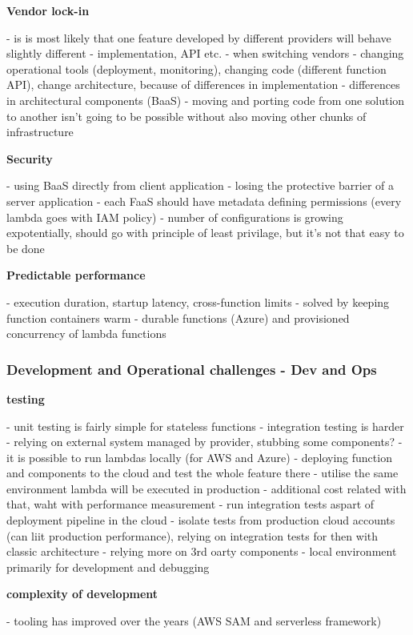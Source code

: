 \textbf{Vendor lock-in} 

- is is most likely that one feature developed by different providers will behave slightly different - implementation, API etc.
- when switching vendors - changing operational tools (deployment, monitoring), changing code (different function API), change architecture, because of differences in implementation
- differences in architectural components (BaaS) - moving and porting code from one solution to another isn't going to be possible without also moving other chunks of infrastructure

\textbf{Security} 

- using BaaS directly from client application - losing the protective barrier of a server application
- each FaaS should have metadata defining permissions (every lambda goes with IAM policy) - number of configurations is growing expotentially, should go with principle of least privilage, but it's not that easy to be done

\textbf{Predictable performance} 

- execution duration, startup latency, cross-function limits - solved by keeping function containers warm - durable functions (Azure) and provisioned concurrency of lambda functions

\subsubsection*{Development and Operational challenges - Dev and Ops} 

\textbf{testing} 

- unit testing is fairly simple for stateless functions
- integration testing is harder - relying on external system managed by provider, stubbing some components?
- it is possible to run lambdas locally (for AWS and Azure)
- deploying function and components to the cloud and test the whole feature there - utilise the same environment lambda will be executed in production - additional cost related with that, waht with performance measurement
- run integration tests aspart of deployment pipeline in the cloud - isolate tests from production cloud accounts (can liit production performance), relying on integration tests for then with classic architecture - relying more on 3rd oarty components
- local environment primarily for development and debugging

\textbf{complexity of development} 

- tooling has improved over the years (AWS SAM and serverless framework)

